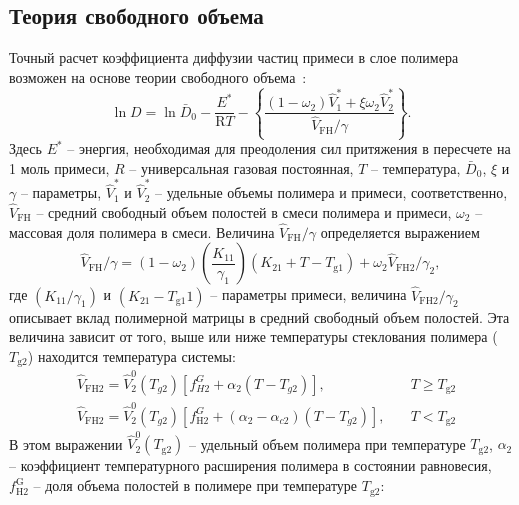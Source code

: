 \subsection{Теория свободного объема}
Точный расчет коэффициента диффузии частиц примеси в слое полимера возможен на основе теории свободного объема~\cite{Vrentas_free_volume, Zielinski_free_volume}:
\begin{equation}
	\ln D=\ln \bar{D}_0-\frac{E^*}{\mathrm{R} T}-\left\{\frac{\left(1-\omega_2\right) \hat{V}_1^*+\xi \omega_2 \hat{V}_2^*}{\hat{V}_{\mathrm{FH}} / \gamma}\right\}.
\end{equation}
Здесь $E^*$ -- энергия, необходимая для преодоления сил притяжения в пересчете на 1 моль примеси, $R$ -- универсальная газовая постоянная, $T$ -- температура, $\bar{D}_0$, $\xi$ и $\gamma$ -- параметры, $\hat{V}_1^*$ и $\hat{V}_2^*$ -- удельные объемы полимера и примеси, соответственно, $\hat{V}_{\mathrm{FH}}$ -- средний свободный объем полостей в смеси полимера и примеси, $\omega_2$ -- массовая доля полимера в смеси. Величина $\hat{V}_{\mathrm{FH}} / \gamma$ определяется выражением
\begin{equation}
	\hat{V}_{\mathrm{FH}} / \gamma=\left(1-\omega_2\right)\left(\frac{K_{11}}{\gamma_1}\right)\left(K_{21}+T-T_{\mathrm{g} 1}\right)+\omega_2 \hat{V}_{\mathrm{FH} 2} / \gamma_2,
\end{equation}
где $\left(K_{11} / \gamma_1\right)$ и $\left(K_{21}-T_\mathrm{g1} 1\right)$ -- параметры примеси, величина $\hat{V}_{\mathrm{FH} 2} / \gamma_2$ описывает вклад полимерной матрицы в средний свободный объем полостей. Эта величина зависит от того, выше или ниже температуры стеклования полимера ($T_\mathrm{g2}$) находится температура системы:
\begin{equation}
	\begin{aligned}
		&\hat{V}_\mathrm{FH2} =
		\hat{V}_2^0 (T_{g2}) \left[ f_{H2}^{G}+\alpha_2 (T-T_{g2}) \right], & T \geq T_\mathrm{g2} \\
		&\hat{V}_\mathrm{FH2} =
		\hat{V}_2^0 (T_{g2})\left[f_\mathrm{H2}^{G}+(\alpha_2-\alpha_{c2})(T-T_{g2})\right], \hspace{1em} & T<T_\mathrm{g2}
	\end{aligned}
\end{equation}
В этом выражении $\hat{V}_2^0\left(T_{\mathrm{g} 2}\right)$ -- удельный объем полимера при температуре $T_\mathrm{g2}$, \linebreak $\alpha_2$ -- коэффициент температурного расширения полимера в состоянии равновесия, $f_{\mathrm{H} 2}^{\mathrm{G}}$ -- доля объема полостей в полимере при температуре $T_\mathrm{g2}$:
